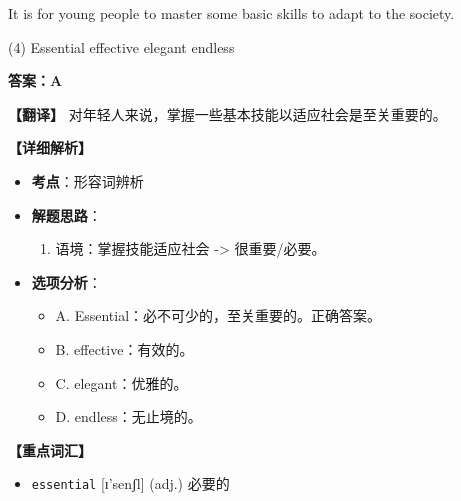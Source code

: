\documentclass[11pt, a4paper]{article}
\newcommand{\analysis}[4]{
    \begin{solutionbox}
        \textbf{答案：#1}
        
        \textbf{【翻译】} #2
        
        \textbf{【详细解析】}
        #3
        
        \textbf{【重点词汇】}
        #4
    \end{solutionbox}
}
\newcommand{\blank}{\underline{\hspace{1.5cm}}}
\begin{document}
\begin{questions}
    \item It is \blank for young people to master some basic skills to adapt to the society.
    \begin{tasks}(4)
        \task Essential \task effective \task elegant \task endless
    \end{tasks}
    \analysis{A}{对年轻人来说，掌握一些基本技能以适应社会是至关重要的。}{
        \begin{itemize}
            \item \textbf{考点}：形容词辨析
            \item \textbf{解题思路}：
                \begin{enumerate}
                    \item 语境：掌握技能适应社会 -> 很重要/必要。
                \end{enumerate}
            \item \textbf{选项分析}：
                \begin{itemize}
                    \item A. Essential：必不可少的，至关重要的。正确答案。
                    \item B. effective：有效的。
                    \item C. elegant：优雅的。
                    \item D. endless：无止境的。
                \end{itemize}
        \end{itemize}
    }{
        \begin{itemize}
            \item \texttt{essential} [ɪ'senʃl] (adj.) 必要的
        \end{itemize}
    }


\end{questions}
\end{document}
